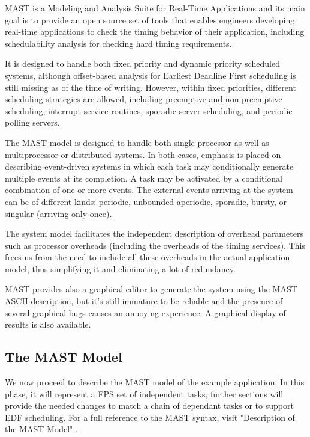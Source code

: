 \documentclass{article}
\begin{document}
MAST \cite{mast} is a Modeling and Analysis Suite for Real-Time Applications and its main goal is to provide an open source set of tools that enables engineers developing real-time applications to check the timing behavior of their application, including schedulability analysis for checking hard timing requirements.

It is designed to handle both fixed priority and dynamic priority scheduled systems, although offset-based analysis for Earliest Deadline First scheduling is still missing as of the time of writing. However, within fixed priorities, different scheduling strategies are allowed, including preemptive and non preemptive scheduling, interrupt service routines, sporadic server scheduling, and periodic polling servers.

The MAST model is designed to handle both single-processor as well as multiprocessor or distributed systems. In both cases, emphasis is placed on describing event-driven systems in which each task may conditionally generate multiple events at its completion. A task may be activated by a conditional combination of one or more events. The external events arriving at the system can be of different kinds: periodic, unbounded aperiodic, sporadic, bursty, or singular (arriving only once).

The system model facilitates the independent description of overhead parameters such as processor overheads (including the overheads of the timing services). This frees us from the need to include all these overheads in the actual application model, thus simplifying it and eliminating a lot of redundancy.

MAST provides also a graphical editor to generate the system using the MAST ASCII description, but it's still immature to be reliable and the presence of several graphical bugs causes an annoying experience. A graphical display of results is also available.

\subsection{The MAST Model}

We now proceed to describe the MAST model of the example application. In this phase, it will represent a FPS set of independent tasks, further sections will provide the needed changes to match a chain of dependant tasks or to support EDF scheduling. For a full reference to the MAST syntax, visit "Description of the MAST Model" \cite{mast-description}.
\end{document}
